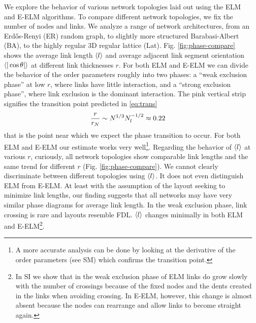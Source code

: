 \documentclass[nofootinbib,preprint,floatfix]{revtex4} %
\begin{document}
We explore the behavior of various network topologies laid out using the ELM and E-ELM algorithms. 
To compare different network topologies, we fix the number of nodes and links. 
We analyze a range of network architectures, from an Erdős-Renyi (ER) random graph, to slightly more structured Barabasi-Albert (BA), 
to the highly regular 3D regular lattice (Lat).
Fig. \ref{fig:phase-compare} shows the average link length $\left<l\right>$ and average adjacent link segment orientation $\be{|\cos\theta|}$ at different link thicknesses $r$. 
For both ELM and E-ELM we can divide the behavior of the order parameters roughly into two phases: a ``weak exclusion phase'' at low $r$, where links have little interaction, and a ``strong exclusion phase'', where link exclusion is the dominant interaction. The pink vertical strip signifies the transition point predicted in \eqref{eq:trans} 
\[{r\over r_N} \sim N^{1/3} N_l^{-1/2}\approx 0.22\]
that is the point near which we expect the phase transition to occur. 
For both ELM and E-ELM our estimate works very well\footnote{A more accurate analysis can be done by looking at the derivative of the order parameters (see SM) which confirms the transition point.}. 
Regarding the behavior of $\left<l\right>$ at various $r$, curiously, all network topologies show comparable link lengths and the same trend for different $r$ (Fig. \ref{fig:phase-compare}).
We cannot clearly discriminate between different topologies using $\left<l\right>$. 
It does not even distinguish ELM from E-ELM. 
At least with the assumption of the layout seeking to minimize link lengths, our finding suggests that all networks may have very similar phase diagrams for average link length. 
In the weak exclusion phase, link crossing is rare and layouts resemble FDL.
$\left<l\right>$ changes minimally in both ELM and E-ELM\footnote{
In SI we show that in the weak exclusion phase of ELM links do grow slowly with the number of crossings because of the fixed nodes and the dents created in the links when avoiding crossing. 
In E-ELM, however, this change is almost absent because the nodes can rearrange and allow links to become straight again.}. 
\end{document}
